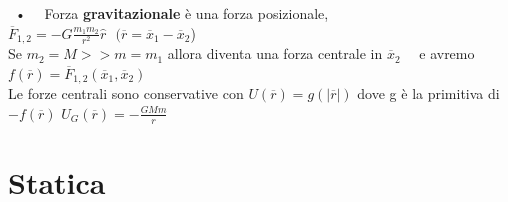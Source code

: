 \documentclass{article}
\theoremstyle{unnumbered}
\theoremstyle{unnumbered1}
\begin{document}
%
\ • \ \ Forza \textbf{gravitazionale} è una forza posizionale, $\overline{F}_{1,2} = -G\frac{m_1m_2}{r^2}\hat{r} \ \ \ (\overline{r}=\overline{x}_1 - \overline{x}_2$)\\
\phantom{} \hspace{0.18in} Se $m_2=M>>m=m_1$ allora diventa una forza centrale in $\overline{x}_2$ \ \ e avremo $f(\overline{r}) = \overline{F}_{1,2}(\overline{x}_1 , \overline{x}_2)$\\
\phantom{} \hspace{0.18in} Le forze centrali sono conservative con $U(\overline{r})=g(|\overline{r}|)$ dove g è la primitiva di $-f(\overline{r})$ \hspace{0.12in} $U_G(\overline{r})= -\frac{GMm}{r}$\\

\newpage




\section{Statica}
%
%
%
\end{document}
